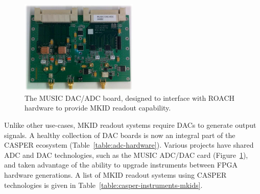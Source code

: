 \documentclass{ws-jai}
\begin{document}
\begin{figure}[htb]
 \centering
 \includegraphics[angle=90,origin=c, width=0.5\textwidth]{./figures/music-adc.jpg}
 \caption{The MUSIC DAC/ADC board, designed to interface with ROACH hardware to provide MKID readout capability.}
 \label{fig:music-adc}
\end{figure}

Unlike other use-cases, MKID readout systems require DACs to generate output signals. A healthy collection of DAC boards is now an integral part of the CASPER ecosystem (Table~\ref{table:adc-hardware}). Various projects have shared ADC and DAC technologies, such as the MUSIC ADC/DAC card (Figure~\ref{fig:music-adc}), and taken advantage of the ability to upgrade instruments between FPGA hardware generations. A list of MKID readout systems using CASPER technologies is given in Table~\ref{table:casper-instruments-mkids}.
\end{document}
